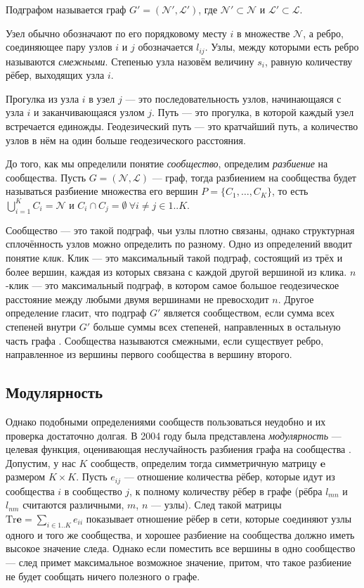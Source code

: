 \documentclass{matmex-diploma}
\begin{document}
Подграфом называется граф $G' = (\mathscr{N}', \mathscr{L}')$, где $\mathscr{N}' \subset \mathscr{N}$ и $\mathscr{L}' \subset \mathscr{L}$.

Узел обычно обозначают по его порядковому месту $i$ в множестве $\mathscr{N}$, а ребро, соединяющее пару узлов $i$ и $j$ обозначается $l_{ij}$. Узлы, между которыми есть ребро называются \emph{смежными}. Степенью узла назовём величину $s_i$, равную количеству рёбер, выходящих узла $i$.

Прогулка из узла $i$ в узел $j$ --- это последовательность узлов, начинающаяся с узла $i$ и заканчивающаяся узлом $j$. Путь --- это прогулка, в которой каждый узел встречается единожды. Геодезический путь --- это кратчайший путь, а количество узлов в нём на один больше геодезического расстояния.

До того, как мы определили понятие \emph{сообщество}, определим \emph{разбиение} на сообщества. Пусть $G = (\mathscr{N}, \mathscr{L})$ --- граф, тогда разбиением на сообщества будет называться разбиение множества его вершин $P = \{C_1, \dots, C_K\}$, то есть $\bigcup_{i = 1}^K C_i = \mathscr{N}$ и $C_i \cap C_j = \emptyset \ \forall i \neq j \in 1..K$.

Сообщество --- это такой подграф, чьи узлы плотно связаны, однако структурная сплочённость узлов можно определить по разному. Одно из определений вводит понятие \emph{клик}. Клик --- это максимальный такой подграф, состоящий из трёх и более вершин, каждая из которых связана с каждой другой вершиной из клика. $n$-клик --- это максимальный подграф, в котором самое большое геодезическое расстояние между любыми двумя вершинами не превосходит $n$. Другое определение гласит, что подграф $G'$ является сообществом, если сумма всех степеней внутри $G'$ больше суммы всех степеней, направленных в остальную часть графа \cite{Wasserman:1994}. Сообщества называются смежными, если существует ребро, направленное из вершины первого сообщества в вершину второго.

\subsection{Модулярность}
Однако подобными определениями сообществ пользоваться неудобно и их проверка достаточно долгая. В 2004 году была представлена \emph{модулярность} --- целевая функция, оценивающая неслучайность разбиения графа на сообщества \cite{Newman&Girvan:2004}. Допустим, у нас $K$ сообществ, определим тогда симметричную матрицу $\mathbf{e}$ размером $K \times K$. Пусть $e_{ij}$ --- отношение количества рёбер, которые идут из сообщества $i$ в сообщество $j$, к полному количеству рёбер в графе (рёбра $l_{mn}$ и $l_{nm}$ считаются различными, $m$, $n$ --- узлы). След такой матрицы $\mathrm{Tr} \mathbf{e} = \sum_{i \in 1..K}{e_{ii}}$ показывает отношение рёбер в сети, которые соединяют узлы одного и того же сообщества, и хорошее разбиение на сообщества должно иметь высокое значение следа. Однако если поместить все вершины в одно сообщество --- след примет максимальное возможное значение, притом, что такое разбиение не будет сообщать ничего полезного о графе.
\end{document}
